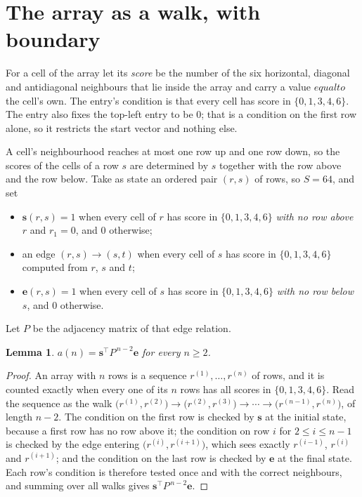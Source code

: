\documentclass[11pt,a4paper]{article}
\theoremstyle{plain}
\newtheorem{lemma}[theorem]{Lemma}
\theoremstyle{definition}
\begin{document}
\section{The array as a walk, with boundary}

For a cell of the array let its \emph{score} be the number of the six horizontal, diagonal and antidiagonal neighbours that lie inside
the array and carry a value $equal to$ the cell's own. The entry's condition is that every cell
has score in $\{0,1,3,4,6\}$. The entry also fixes the top-left entry to be $0$; that is a condition on the first row alone, so it restricts the start vector and nothing else.

A cell's neighbourhood reaches at most one row up and one row down, so the scores of the
cells of a row $s$ are determined by $s$ together with the row above and the row below.
Take as state an ordered pair $(r,s)$ of rows, so $S=64$, and set
\begin{itemize}
\item $\mathbf{s}(r,s)=1$ when every cell of $r$ has score in $\{0,1,3,4,6\}$ \emph{with no row
above $r$} and $r_1=0$, and $0$ otherwise;
\item an edge $(r,s)\to(s,t)$ when every cell of $s$ has score in $\{0,1,3,4,6\}$ computed from
$r$, $s$ and $t$;
\item $\mathbf{e}(r,s)=1$ when every cell of $s$ has score in $\{0,1,3,4,6\}$ \emph{with no row
below $s$}, and $0$ otherwise.
\end{itemize}
Let $P$ be the adjacency matrix of that edge relation.

\begin{lemma}\label{lem:walk}
$a(n)=\mathbf{s}^{\!\top}P^{\,n-2}\mathbf{e}$ for every $n\ge2$.
\end{lemma}

\begin{proof}
An array with $n$ rows is a sequence $r^{(1)},\dots,r^{(n)}$ of rows, and it is counted
exactly when every one of its $n$ rows has all scores in $\{0,1,3,4,6\}$. Read the sequence as the
walk $\bigl(r^{(1)},r^{(2)}\bigr)\to\bigl(r^{(2)},r^{(3)}\bigr)\to\cdots\to
\bigl(r^{(n-1)},r^{(n)}\bigr)$, of length $n-2$. The condition on the first row is
checked by $\mathbf{s}$ at the initial state, because a first row has no row above it; the
condition on row $i$ for $2\le i\le n-1$ is checked by the edge entering
$\bigl(r^{(i)},r^{(i+1)}\bigr)$, which sees exactly $r^{(i-1)}$, $r^{(i)}$ and
$r^{(i+1)}$; and the condition on the last row is checked by $\mathbf{e}$ at the final
state. Each row's condition is therefore tested once and with the correct neighbours, and
summing over all walks gives $\mathbf{s}^{\!\top}P^{\,n-2}\mathbf{e}$.
\end{proof}
\end{document}
